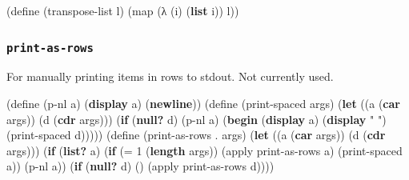 \documentclass[
]{article}
\newenvironment{Shaded}{}{}
\newcommand{\DecValTok}[1]{\textcolor[rgb]{0.25,0.63,0.44}{#1}}
\newcommand{\ExtensionTok}[1]{#1}
\newcommand{\FunctionTok}[1]{\textcolor[rgb]{0.02,0.16,0.49}{#1}}
\newcommand{\KeywordTok}[1]{\textcolor[rgb]{0.00,0.44,0.13}{\textbf{#1}}}
\newcommand{\NormalTok}[1]{#1}
\newcommand{\OperatorTok}[1]{\textcolor[rgb]{0.40,0.40,0.40}{#1}}
\newcommand{\StringTok}[1]{\textcolor[rgb]{0.25,0.44,0.63}{#1}}
\begin{document}
\hypertarget{transpose-list}{%
\label{transpose-list}}%
\begin{Shaded}
\begin{Highlighting}[numbers=left,,]
\NormalTok{(}\ExtensionTok{define}\FunctionTok{ }\NormalTok{(transpose{-}list l)}
\NormalTok{  (map (λ (i) (}\KeywordTok{list}\NormalTok{ i)) l))}
\end{Highlighting}
\end{Shaded}

\hypertarget{print-as-rows}{%
\subsubsection{\texorpdfstring{\texttt{print-as-rows}}{print-as-rows}}\label{print-as-rows}}

For manually printing items in rows to stdout. Not currently used.

\hypertarget{print-as-rows}{%
\label{print-as-rows}}%
\begin{Shaded}
\begin{Highlighting}[numbers=left,,]
\NormalTok{(}\ExtensionTok{define}\FunctionTok{ }\NormalTok{(p{-}nl a)}
\NormalTok{  (}\KeywordTok{display}\NormalTok{ a)}
\NormalTok{  (}\KeywordTok{newline}\NormalTok{))}
\NormalTok{(}\ExtensionTok{define}\FunctionTok{ }\NormalTok{(print{-}spaced args)}
\NormalTok{  (}\KeywordTok{let}\NormalTok{ ((a (}\KeywordTok{car}\NormalTok{ args))}
\NormalTok{        (d (}\KeywordTok{cdr}\NormalTok{ args)))}
\NormalTok{    (}\KeywordTok{if}\NormalTok{ (}\KeywordTok{null?}\NormalTok{ d)}
\NormalTok{        (p{-}nl a)}
\NormalTok{        (}\KeywordTok{begin}\NormalTok{ (}\KeywordTok{display}\NormalTok{ a)}
\NormalTok{               (}\KeywordTok{display} \StringTok{" "}\NormalTok{)}
\NormalTok{               (print{-}spaced d)))))}
\NormalTok{(}\ExtensionTok{define}\FunctionTok{ }\NormalTok{(print{-}as{-}rows }\OperatorTok{.}\NormalTok{ args)}
\NormalTok{  (}\KeywordTok{let}\NormalTok{ ((a (}\KeywordTok{car}\NormalTok{ args))}
\NormalTok{        (d (}\KeywordTok{cdr}\NormalTok{ args)))}
\NormalTok{    (}\KeywordTok{if}\NormalTok{ (}\KeywordTok{list?}\NormalTok{ a)}
\NormalTok{        (}\KeywordTok{if}\NormalTok{ (}\OperatorTok{=} \DecValTok{1}\NormalTok{ (}\KeywordTok{length}\NormalTok{ args))}
\NormalTok{            (apply print{-}as{-}rows a)}
\NormalTok{            (print{-}spaced a))}
\NormalTok{        (p{-}nl a))}
\NormalTok{    (}\KeywordTok{if}\NormalTok{ (}\KeywordTok{null?}\NormalTok{ d)}
\NormalTok{        \textquotesingle{}()}
\NormalTok{        (apply print{-}as{-}rows d))))}
\end{Highlighting}
\end{Shaded}
\end{document}
